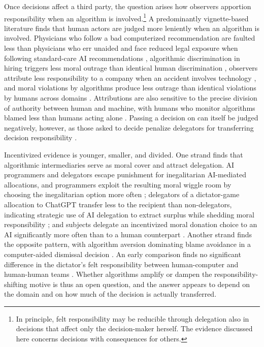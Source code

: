 Once decisions affect a third party, the question arises how observers apportion responsibility when an algorithm is involved.\footnote{In principle, felt responsibility may be reducible through delegation also in decisions that affect only the decision-maker herself. The evidence discussed here concerns decisions with consequences for others.} A predominantly vignette-based literature finds that human actors are judged more leniently when an algorithm is involved. Physicians who follow a bad computerized recommendation are faulted less than physicians who err unaided \citep{pezzo_pezzo_physician_2006} and face reduced legal exposure when following standard-care AI recommendations \citep{tobia_when_2021}, algorithmic discrimination in hiring triggers less moral outrage than identical human discrimination \citep{bigman_algorithmic_2023}, observers attribute less responsibility to a company when an accident involves technology \citep{kurtzberg_attribution_2004}, and moral violations by algorithms produce less outrage than identical violations by humans across domains \citep{bigman_people_2018}. Attributions are also sensitive to the precise division of authority between human and machine, with humans who monitor algorithms blamed less than humans acting alone \citep{shank_attributions_2019}. Passing a decision on can itself be judged negatively, however, as those asked to decide penalize delegators for transferring decision responsibility \citep{blunden_downside_2023}.

Incentivized evidence is younger, smaller, and divided. One strand finds that algorithmic intermediaries serve as moral cover and attract delegation. AI programmers and delegators escape punishment for inegalitarian AI-mediated allocations, and programmers exploit the resulting moral wiggle room by choosing the inegalitarian option more often \citep{chevrier_algorithm_2024}; delegators of a dictator-game allocation to ChatGPT transfer less to the recipient than non-delegators, indicating strategic use of AI delegation to extract surplus while shedding moral responsibility \citep{tontrup_strategic_2025}; and subjects delegate an incentivized moral donation choice to an AI significantly more often than to a human counterpart \citep{hueholt_trusting_2026}. Another strand finds the opposite pattern, with algorithm aversion dominating blame avoidance in a computer-aided dismissal decision \citep{maasland_blame_2022}. An early comparison finds no significant difference in the dictator's felt responsibility between human-computer and human-human teams \citep{kirchkamp_sharing_2019}. Whether algorithms amplify or dampen the responsibility-shifting motive is thus an open question, and the answer appears to depend on the domain and on how much of the decision is actually transferred.

